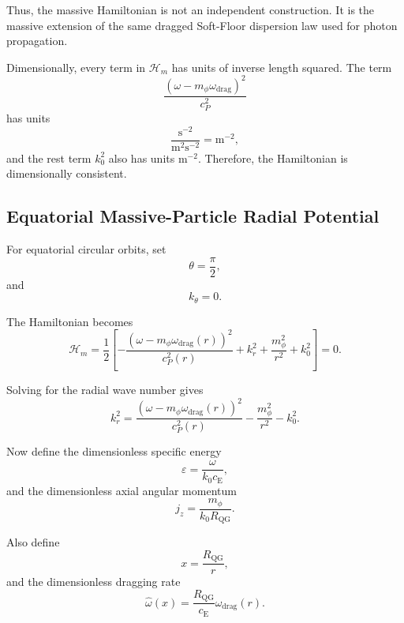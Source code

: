 Thus, the massive Hamiltonian is not an independent construction. It is the massive extension of the same dragged Soft-Floor dispersion law used for photon propagation.

Dimensionally, every term in $\mathcal{H}_m$ has units of inverse length squared. The term
\begin{equation}
    \frac{ \left( \omega - m_{\phi}\omega_{\mathrm{drag}} \right)^2 }{ c_P^2 }
\end{equation}
has units
\begin{equation}
    \frac{\mathrm{s}^{-2}}{\mathrm{m^2s^{-2}}} = \mathrm{m^{-2}},
\end{equation}
and the rest term $k_0^2$ also has units $\mathrm{m^{-2}}$. Therefore, the Hamiltonian is dimensionally consistent.

\subsection{Equatorial Massive-Particle Radial Potential}

For equatorial circular orbits, set
\begin{equation}
    \theta = \frac{\pi}{2},
\end{equation}
and
\begin{equation}
    k_{\theta} = 0.
\end{equation}

The Hamiltonian becomes
\begin{equation}
    \mathcal{H}_m = \frac{1}{2} \left[ - \frac{ \left( \omega - m_{\phi}\omega_{\mathrm{drag}}(r) \right)^2 }{ c_P^2(r) } + k_r^2 + \frac{m_{\phi}^2}{r^2} + k_0^2 \right] = 0.
\end{equation}

Solving for the radial wave number gives
\begin{equation}
    k_r^2 = \frac{ \left( \omega - m_{\phi}\omega_{\mathrm{drag}}(r) \right)^2 }{ c_P^2(r) } - \frac{m_{\phi}^2}{r^2} - k_0^2.
\end{equation}

Now define the dimensionless specific energy
\begin{equation}
    \varepsilon = \frac{\omega}{k_0 c_{\mathrm{E}}},
\end{equation}
and the dimensionless axial angular momentum
\begin{equation}
    j_z = \frac{m_{\phi}}{k_0 R_{\mathrm{QG}}}.
\end{equation}

Also define
\begin{equation}
    x = \frac{R_{\mathrm{QG}}}{r},
\end{equation}
and the dimensionless dragging rate
\begin{equation}
    \widehat{\omega}(x) = \frac{R_{\mathrm{QG}}}{c_{\mathrm{E}}} \omega_{\mathrm{drag}}(r).
\end{equation}

